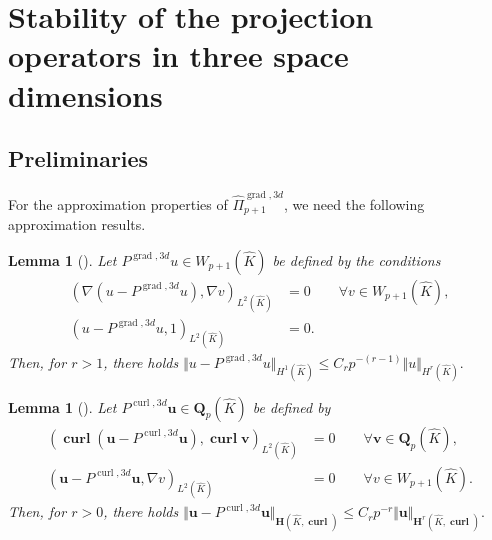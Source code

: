 \documentclass{article}
\newtheorem{lemma}[theorem]{Lemma}
\newcommand{\hatPigradcom}{\widehat\Pi^{\operatorname*{grad},3d}_{p+1}}
\begin{document}

\section{Stability of the projection operators in three space dimensions}

\subsection{Preliminaries}

For the approximation properties of $\hatPigradcom$, 
we need the following approximation results.

\begin{lemma}
[\!\!]
\label{lemma:Pgrad3d}
Let $P^{\operatorname*{grad},3d}u\in W_{p+1}(\widehat{K})$ be defined by the conditions
\begin{subequations}
\label{eq:lemma:Pgrad3d}
\begin{align}
\label{eq:lemma:Pgrad3d-a}
(\nabla(u-P^{\operatorname*{grad},3d}u),\nabla v)_{L^2(\widehat{K})} &= 0 \qquad \forall v\in W_{p+1}(\widehat{K}),\\
(u-P^{\operatorname*{grad},3d}u,1)_{L^2(\widehat{K})} &= 0.
\label{eq:lemma:Pgrad3d-b}
\end{align}
\end{subequations}
Then, for $r>1$, there holds 
$\displaystyle 
\Vert u-P^{\operatorname*{grad},3d}u\Vert_{H^1(\widehat{K})} \leq C_r p^{-(r-1)} \Vert u\Vert_{H^r(\widehat{K})}.
$
\end{lemma}

\begin{lemma}
[\!\!]
\label{lemma:Pcurl3d} Let $P^{\operatorname*{curl},3d}{\mathbf{u}}%
\in\mathbf{Q}_p(\widehat{K})$ be defined
by 
\begin{subequations}\label{eq:lemma:Pcurl3d}
\begin{align}
(\operatorname{\mathbf{curl}}({\mathbf{u}}-P^{\operatorname*{curl},3d}{\mathbf{u}%
}),\operatorname{\mathbf{curl}}{\mathbf{v}})_{L^{2}(\widehat{K})}  &  =0\qquad
\forall{\mathbf{v}}\in\mathbf{Q}_p(\widehat{K}),
\label{eq:lemma:Pcurl3d-a}\\
({\mathbf{u}}-P^{\operatorname*{curl},3d}{\mathbf{u}},\nabla v)_{L^{2}%
(\widehat{K})}  &  =0\qquad\forall v\in W_{p+1}(\widehat{K}). 
\label{eq:lemma:Pcurl3d-b}%
\end{align}
\end{subequations}
Then, for $r>0$, there holds 
$\displaystyle 
\Vert{\mathbf{u}}-P^{\operatorname*{curl},3d}{\mathbf{u}}\Vert_{{\mathbf{H}%
}(\widehat{K},\operatorname{\mathbf{curl}})}\leq C_{r}p^{-r}\Vert{\mathbf{u}}%
\Vert_{{\mathbf{H}}^{r}(\widehat{K},\operatorname{\mathbf{curl}})}. $
\end{lemma}
\end{document}
